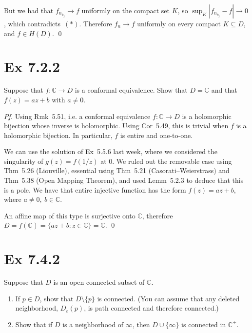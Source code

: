 \documentclass[a4paper]{article}
\begin{document}
\medskip
But we had that $f_{n_{k_{j}}}\to f$ uniformly on the compact set $K$, so $\sup_{K}|f_{n_{k_{j}}}-f|\to 0$, which contradicts~$(\ast)$. Therefore $f_{n}\to f$ uniformly on every compact $K\subseteq D$, and $f\in H(D)$. \qed

\newpage

\section*{Ex 7.2.2}

\begin{tcolorbox}[colback=gray!10, colframe=black, boxrule=0.5pt, arc=2mm]
Suppose that $f:\mathbb{C}\to D$ is a conformal equivalence. Show that $D=\mathbb{C}$ and that $f(z)=az+b$ with $a\neq0$.
\end{tcolorbox}

\textit{Pf.} Using Rmk~5.51, i.e. a conformal equivalence $f:\mathbb{C}\to D$ is a holomorphic bijection whose inverse is holomorphic. Using Cor~5.49, this is trivial when $f$ is a holomorphic bijection. In particular, $f$ is entire and one-to-one.

\medskip
We can use the solution of Ex~5.5.6 last week, where we considered the singularity of $g(z)=f(1/z)$ at $0$. We ruled out the removable case using Thm~5.26 (Liouville), essential using Thm~5.21 (Casorati--Weierstrass) and Thm~5.38 (Open Mapping Theorem), and used Lemm~5.2.3 to deduce that this is a pole. We have that entire injective function has the form $f(z)=az+b$, where $a\ne 0,\ b\in\mathbb{C}$.

\medskip
An affine map of this type is surjective onto $\mathbb{C}$, therefore $D=f(\mathbb{C})=\{az+b:z\in\mathbb{C}\}=\mathbb{C}$. \qed

\newpage

\section*{Ex 7.4.2}

\begin{tcolorbox}[colback=gray!10, colframe=black, boxrule=0.5pt, arc=2mm]
Suppose that $D$ is an open connected subset of $\mathbb{C}$.
\begin{enumerate}
  \item[(a)] If $p\in D$, show that $D\setminus\{p\}$ is connected. (You can assume that any deleted neighborhood, $D_{\varepsilon}(p)$, is path connected and therefore connected.)
  \item[(b)] Show that if $D$ is a neighborhood of $\infty$, then $D\cup\{\infty\}$ is connected in $\mathbb{C}^{+}$.
\end{enumerate}
\end{tcolorbox}
\end{document}
